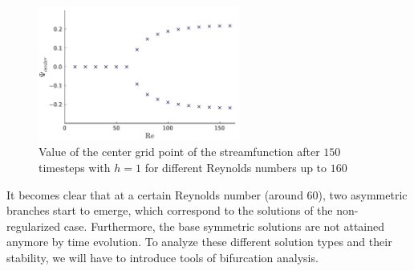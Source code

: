 \begin{figure}[h!]
\begin{center}
  \includegraphics[width=0.59\textwidth]{figs/timestepping64x64.pdf}
\end{center}
\caption{Value of the center grid point of the streamfunction after $150$
  timesteps with $h=1$ for different Reynolds numbers up to $160$}
\label{fig:timestepping}
\end{figure}

It becomes clear that at a certain Reynolds number (around $60$), two
asymmetric branches start to emerge, which correspond to the solutions of the
non-regularized case. Furthermore, the base symmetric solutions are not
attained anymore by time evolution. To analyze these different solution types
and their stability, we will have to introduce tools of bifurcation analysis.
